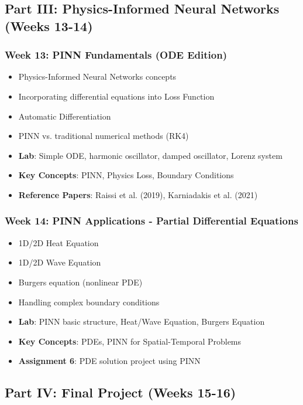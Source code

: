 \documentclass[11pt,a4paper]{article}
\begin{document}
\subsection{Part III: Physics-Informed Neural Networks (Weeks 13-14)}

\subsubsection*{Week 13: PINN Fundamentals (ODE Edition)}
\begin{itemize}[noitemsep]
    \item Physics-Informed Neural Networks concepts
    \item Incorporating differential equations into Loss Function
    \item Automatic Differentiation
    \item PINN vs. traditional numerical methods (RK4)
    \item \textbf{Lab}: Simple ODE, harmonic oscillator, damped oscillator, Lorenz system
    \item \textbf{Key Concepts}: PINN, Physics Loss, Boundary Conditions
    \item \textbf{Reference Papers}: Raissi et al. (2019), Karniadakis et al. (2021)
\end{itemize}

\subsubsection*{Week 14: PINN Applications - Partial Differential Equations}
\begin{itemize}[noitemsep]
    \item 1D/2D Heat Equation
    \item 1D/2D Wave Equation
    \item Burgers equation (nonlinear PDE)
    \item Handling complex boundary conditions
    \item \textbf{Lab}: PINN basic structure, Heat/Wave Equation, Burgers Equation
    \item \textbf{Key Concepts}: PDEs, PINN for Spatial-Temporal Problems
    \item \textbf{Assignment 6}: PDE solution project using PINN
\end{itemize}

\subsection{Part IV: Final Project (Weeks 15-16)}
\end{document}
